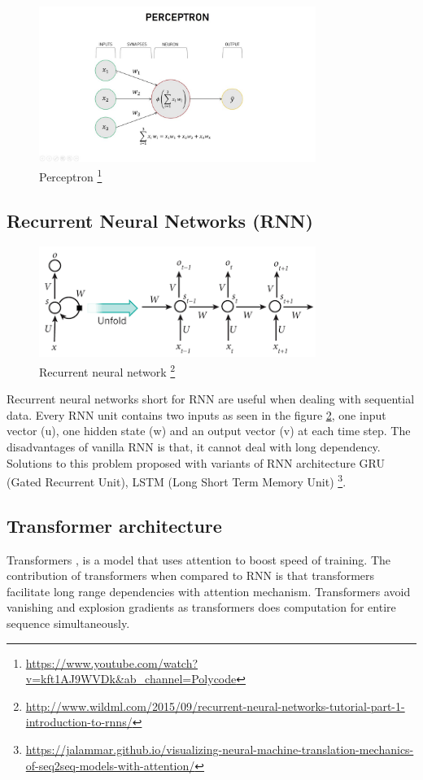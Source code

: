 \begin{figure}[t]
            \includegraphics[width=9cm]{thesis/figures/perceptronLearningAlgo.jpg}
            \centering
            \caption{Perceptron \footnote{\url{https://www.youtube.com/watch?v=kft1AJ9WVDk&ab_channel=Polycode}}}
            \label{fig:PLA}
\end{figure}
\subsection {Recurrent Neural Networks (RNN)}
\begin{figure}[]
            \includegraphics[width=9cm]{thesis/figures/RNN.png}
            \centering
            \caption{Recurrent neural network \footnote{\url{http://www.wildml.com/2015/09/recurrent-neural-networks-tutorial-part-1-introduction-to-rnns/}}}
            \label{fig:RNN}
\end{figure}
Recurrent neural networks short for RNN \cite{mikolov2010recurrent} are useful when dealing with sequential data. Every RNN unit contains two inputs as seen in the figure \ref{fig:RNN}, one input vector (u), one hidden state (w) and an output vector (v) at each time step. The disadvantages of vanilla RNN is that, it  cannot deal with long dependency. Solutions to this problem proposed with variants of RNN architecture GRU (Gated Recurrent Unit), LSTM (Long Short Term Memory Unit) \cite{mikolov2010recurrent}\footnote{\url{https://jalammar.github.io/visualizing-neural-machine-translation-mechanics-of-seq2seq-models-with-attention/}}.
\subsection{Transformer architecture \cite{vaswani2017attention}}
Transformers \cite{vaswani2017attention}, is a model that uses attention to boost speed of training. The contribution of transformers when compared to RNN is that transformers facilitate long range dependencies with attention mechanism. Transformers avoid vanishing and explosion gradients as transformers does computation for entire sequence simultaneously. 

